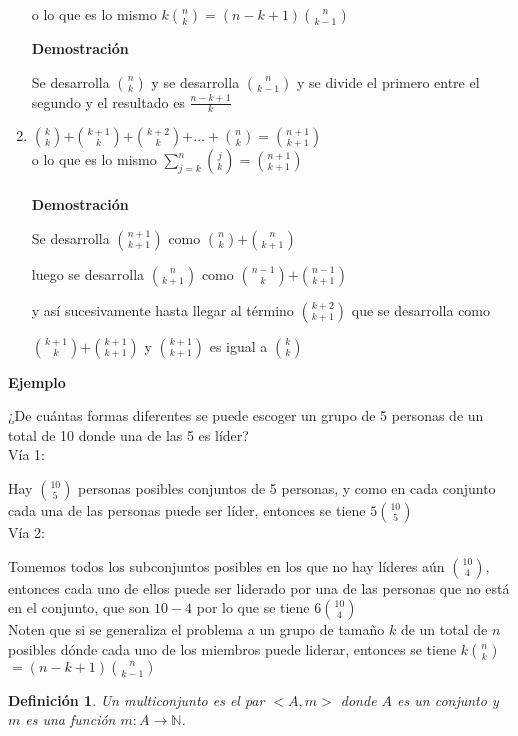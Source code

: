 \documentclass[a4paper,12pt]{report}
\newtheorem*{dfn}{Definición}
\begin{document}
\begin{enumerate}
 o lo que es lo mismo $k$${n}\choose{k}$$=(n-k+1)$${n}\choose{k-1}$
 
 \textbf{Demostración}
 
 Se desarrolla ${n}\choose{k}$ y se desarrolla ${n}\choose{k-1}$ y se divide el primero entre el segundo y el resultado es $\frac{n-k+1}{k}$
 
 \item ${k}\choose{k}$$+$${k+1}\choose{k}$$+$${k+2}\choose{k}$$+\dots +$${n}\choose{k}$$=$${n+1}\choose{k+1}$\\ 
 o lo que es lo mismo $\sum^n_{j=k}$${j}\choose{k}$$=$${n+1}\choose{k+1}$\\\\
 
 \textbf{Demostración}
 
 Se desarrolla ${n+1}\choose{k+1}$ como ${n}\choose{k}$$+$${n}\choose{k+1}$
 
 luego se desarrolla ${n}\choose{k+1}$ como ${n-1}\choose{k}$$+$${n-1}\choose{k+1}$
 
 y así sucesivamente hasta llegar al término ${k+2}\choose{k+1}$ que se desarrolla como 
 
 ${k+1}\choose{k}$$+$${k+1}\choose{k+1}$ y ${k+1}\choose{k+1}$ es igual a ${k}\choose{k}$
 
\end{enumerate}

\textbf{Ejemplo}

¿De cuántas formas diferentes se puede escoger un grupo de 5 personas de un total de 10 donde una de las 5 es líder?\\

Vía 1:

Hay ${10}\choose{5}$ personas posibles conjuntos de 5 personas, y como en cada conjunto cada una de las personas puede ser líder, entonces se tiene $5$${10}\choose{5}$\\

Vía 2:

Tomemos todos los subconjuntos posibles en los que no hay líderes aún ${10}\choose{4}$, entonces cada uno de ellos puede ser liderado por una de las personas que no está en el conjunto, que son $10-4$ por lo que se tiene $6$${10}\choose{4}$\\

Noten que si se generaliza el problema a un grupo de tamaño $k$ de un total de $n$ posibles dónde cada uno de los miembros puede liderar, entonces se tiene $k$${n}\choose{k}$$=(n-k+1)$${n}\choose{k-1}$

\begin{dfn}
 Un multiconjunto es el  par $<A,m>$ donde $A$ es un conjunto y $m$ es una función $m:A\rightarrow \mathbb{N}$. 
\end{dfn}
\end{document}
